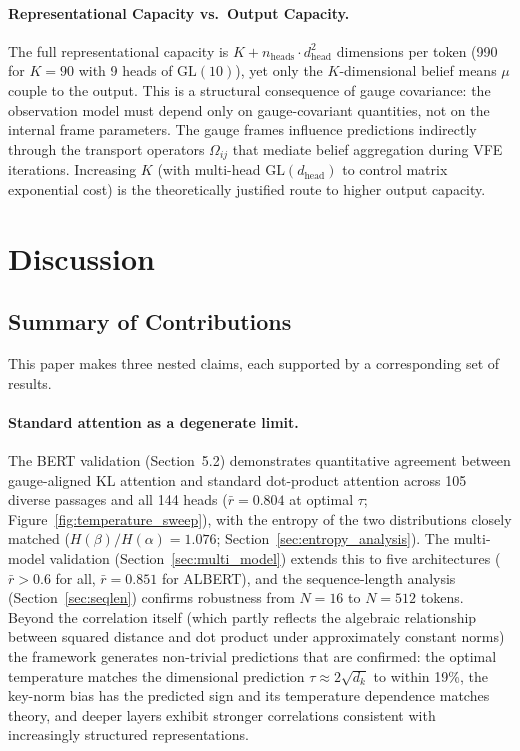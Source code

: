 \documentclass[twoside,11pt]{article}
\begin{document}
\paragraph{Representational Capacity vs.\ Output Capacity.}
The full representational capacity is $K + n_{\mathrm{heads}} \cdot d_{\mathrm{head}}^2$ dimensions per token (990 for $K=90$ with 9 heads of $\mathrm{GL}(10)$), yet only the $K$-dimensional belief means $\mu$ couple to the output. This is a structural consequence of gauge covariance: the observation model must depend only on gauge-covariant quantities, not on the internal frame parameters. The gauge frames influence predictions indirectly through the transport operators $\Omega_{ij}$ that mediate belief aggregation during VFE iterations. Increasing $K$ (with multi-head $\mathrm{GL}(d_{\text{head}})$ to control matrix exponential cost) is the theoretically justified route to higher output capacity.



\section{Discussion}

\subsection{Summary of Contributions}

This paper makes three nested claims, each supported by a corresponding set of results.

\paragraph{Standard attention as a degenerate limit.} The BERT validation (Section~5.2) demonstrates quantitative agreement between gauge-aligned KL attention and standard dot-product attention across 105 diverse passages and all 144 heads ($\bar{r} = 0.804$ at optimal $\tau$; Figure~\ref{fig:temperature_sweep}), with the entropy of the two distributions closely matched ($H(\beta)/H(\alpha) = 1.076$; Section~\ref{sec:entropy_analysis}). The multi-model validation (Section~\ref{sec:multi_model}) extends this to five architectures ($\bar{r} > 0.6$ for all, $\bar{r} = 0.851$ for ALBERT), and the sequence-length analysis (Section~\ref{sec:seqlen}) confirms robustness from $N = 16$ to $N = 512$ tokens. Beyond the correlation itself (which partly reflects the algebraic relationship between squared distance and dot product under approximately constant norms) the framework generates non-trivial predictions that are confirmed: the optimal temperature matches the dimensional prediction $\tau \approx 2\sqrt{d_k}$ to within 19\%, the key-norm bias has the predicted sign and its temperature dependence matches theory, and deeper layers exhibit stronger correlations consistent with increasingly structured representations.
\end{document}
